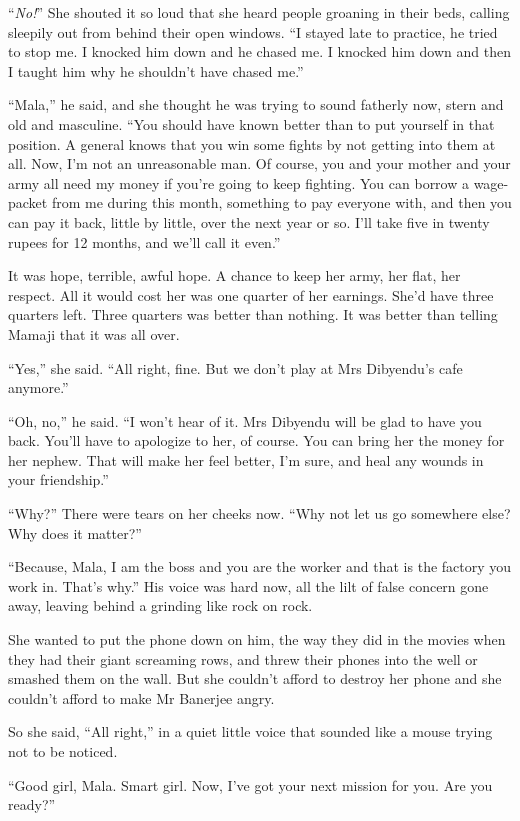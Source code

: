 ``\emph{No!}'' She shouted it so loud that she heard people groaning
in their beds, calling sleepily out from behind their open windows.
``I stayed late to practice, he tried to stop me. I knocked him down
and he chased me. I knocked him down and then I taught him why he
shouldn't have chased me.''

``Mala,'' he said, and she thought he was trying to sound fatherly
now, stern and old and masculine. ``You should have known better
than to put yourself in that position. A general knows that you win
some fights by not getting into them at all. Now, I'm not an
unreasonable man. Of course, you and your mother and your army all
need my money if you're going to keep fighting. You can borrow a
wage-packet from me during this month, something to pay everyone
with, and then you can pay it back, little by little, over the next
year or so. I'll take five in twenty rupees for 12 months, and
we'll call it even.''

It was hope, terrible, awful hope. A chance to keep her army, her
flat, her respect. All it would cost her was one quarter of her
earnings. She'd have three quarters left. Three quarters was better
than nothing. It was better than telling Mamaji that it was all
over.

``Yes,'' she said. ``All right, fine. But we don't play at Mrs
Dibyendu's cafe anymore.''

``Oh, no,'' he said. ``I won't hear of it. Mrs Dibyendu will be glad
to have you back. You'll have to apologize to her, of course. You
can bring her the money for her nephew. That will make her feel
better, I'm sure, and heal any wounds in your friendship.''

``Why?'' There were tears on her cheeks now. ``Why not let us go
somewhere else? Why does it matter?''

``Because, Mala, I am the boss and you are the worker and that is
the factory you work in. That's why.'' His voice was hard now, all
the lilt of false concern gone away, leaving behind a grinding like
rock on rock.

She wanted to put the phone down on him, the way they did in the
movies when they had their giant screaming rows, and threw their
phones into the well or smashed them on the wall. But she couldn't
afford to destroy her phone and she couldn't afford to make Mr
Banerjee angry.

So she said, ``All right,'' in a quiet little voice that sounded like
a mouse trying not to be noticed.

``Good girl, Mala. Smart girl. Now, I've got your next mission for
you. Are you ready?''

